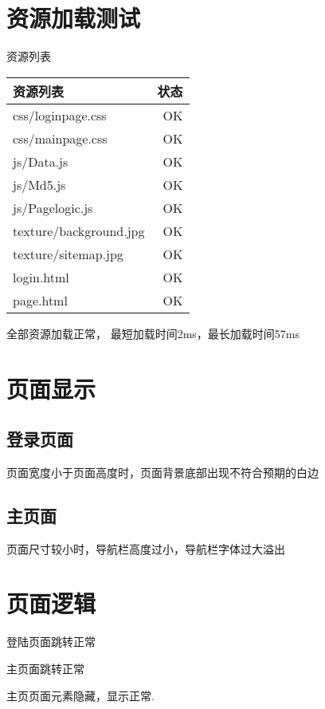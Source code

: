 \documentclass[UTF8]{report}
\begin{document}
    \section{资源加载测试}
    资源列表
    \begin{tabular}{|l|r|}
        \hline 资源列表 & 状态  \\ \hline
    css/loginpage.css  & OK \\ \hline
    css/mainpage.css &  OK \\ \hline
    js/Data.js   &OK \\ \hline
    js/Md5.js   &OK \\ \hline
    js/Pagelogic.js &  OK \\ \hline
    texture/background.jpg&   OK \\ \hline
    texture/sitemap.jpg   &OK \\ \hline
    login.html  & OK \\ \hline
    page.html  & OK \\ \hline
    \end{tabular} 
    全部资源加载正常，
    最短加载时间2ms，最长加载时间57ms
    
    \section{页面显示}
    \subsection{登录页面}
    页面宽度小于页面高度时，页面背景底部出现不符合预期的白边
    \subsection{主页面}
    页面尺寸较小时，导航栏高度过小，导航栏字体过大溢出
    
    \section{页面逻辑}
    登陆页面跳转正常 \par
    主页面跳转正常 \par
    主页页面元素隐藏，显示正常.
\end{document}
